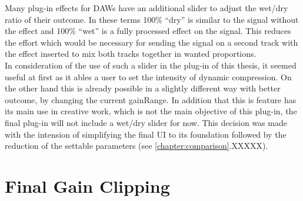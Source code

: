 Many plug-in effects for DAWs have an additional slider to adjust the wet/dry ratio of their outcome. In these terms 100\% “dry” is similar to the signal without the effect and 100\% “wet” is a fully processed effect on the signal. This reduces the effort which would be necessary for sending the signal on a second track with the effect inserted to mix both tracks together in wanted proportions.\\
In consideration of the use of such a slider in the plug-in of this thesis, it seemed useful at first as it ables a user to set the intensity of dynamic compression. On the other hand this is already possible in a slightly different way with better outcome, by changing the current gainRange. In addition that this is feature has its main use in creative work, which is not the main objective of this plug-in, the final plug-in will not include a wet/dry slider for now. This decision was made with the intension of simplifying the final UI to its foundation followed by the reduction of the settable parameters (see \ref{chapter:comparison}.XXXXX).\\

\section{Final Gain Clipping}

